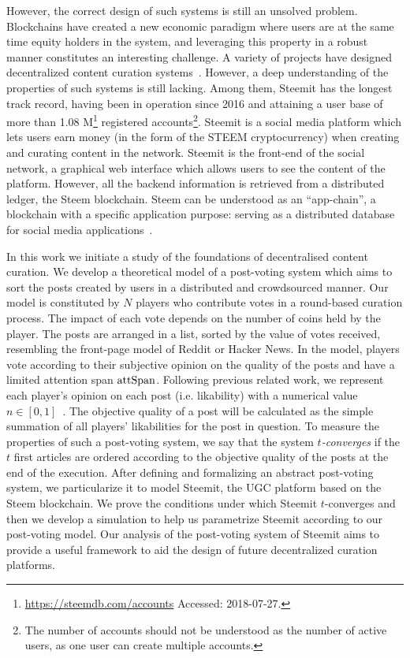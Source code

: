    However, the correct design of such systems is still an unsolved problem. Blockchains have created a new economic paradigm where users are at the same time equity holders in the system, and leveraging this property in a robust manner constitutes an interesting challenge.
   A variety of projects have designed decentralized content curation systems~\cite{synereo,steemit,tcr}. However, a deep understanding of the properties of such systems is still lacking. Among them, Steemit
has the longest track record, having been in operation since 2016 and attaining a user base of more than 1.08 M\footnote{\url{https://steemdb.com/accounts} Accessed: 2018-07-27.} registered accounts\footnote{The number of accounts should not be understood as the number of active users, as one user can create multiple accounts.}. Steemit is a social media platform which lets users earn money (in the form of the STEEM cryptocurrency) when creating and curating content in the network. Steemit is the front-end of the social network, a graphical web interface which allows users to see the content of the platform. However, all the backend information is retrieved from a distributed ledger, the Steem blockchain. Steem can be understood as an ``app-chain'', a blockchain with a specific application purpose: serving as a distributed database for social media applications~\cite{steemit}.

In this work we initiate a study of the foundations of decentralised content curation. We develop a theoretical model of a post-voting system which aims to sort the posts created by users in a distributed and crowdsourced manner.
  Our model is constituted by $N$ players who contribute votes in a round-based curation process. The impact of each vote depends on the number of coins held by the player.
   The posts are arranged in a list, sorted by the value of votes received, resembling the front-page model of Reddit or Hacker News. In the model, players vote according to their subjective opinion on the quality of the posts and have a limited attention span $\mathrm{attSpan}$.
   Following previous related work, we represent each player's opinion on each post (i.e. likability) with a numerical value $n \in [ 0,1 ]$~\cite{ghosh2011incentivizing,askalidis2013theoretical}.
   The objective quality of a post will be calculated as the simple summation of all players' likabilities for the post in question. To measure the properties of such a post-voting system, we say that the system \textit{$t$-converges} if the $t$ first articles are ordered according to the objective quality of the posts at the end of the execution.
  After defining and formalizing an abstract post-voting system, we particularize it to model Steemit, the UGC platform based on the Steem blockchain.
   We prove the conditions under which Steemit $t$-converges and then we develop a simulation to help us parametrize Steemit according to our post-voting model.
   Our analysis of the post-voting system of Steemit aims to provide a useful framework to aid the design of future decentralized curation platforms. 

